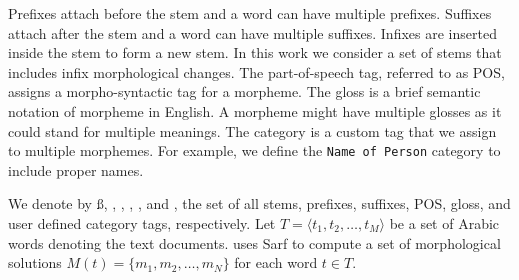 Prefixes attach before the stem and a word can have multiple prefixes. 
Suffixes attach after the stem and a word can have multiple suffixes. 
Infixes are inserted inside the stem to form a new stem. 
In this work we consider a set of stems that includes infix morphological changes. 
The part-of-speech tag, referred to as POS, 
assigns a morpho-syntactic tag for a morpheme. 
The gloss is a brief semantic notation of morpheme in English. 
A morpheme might have multiple glosses as it could stand for multiple meanings. 
The category is a custom tag that we assign to multiple morphemes. 
For example, we define the {\tt Name of Person} category to include proper names.

We denote by 
\ss,
\pp,
\xx,
\PP,
\GG, and 
\AC, the set of 
all stems,
prefixes,
suffixes,
POS,
gloss, 
and user defined category tags, respectively. 
Let $T=\langle t_1,t_2,\ldots,t_M\rangle$ be a set of Arabic words denoting the 
text documents. 
\framework uses Sarf to compute a set of morphological solutions $M(t)=\{m_1,m_2,\ldots,m_N\}$
for each word $t\in T$. 
%

\begin{table}[tb!]
  \centering
  \caption{Sample solution vector for .}
  \label{tab:samplesolution}%
  \vspace{-2em}
\end{table}%

